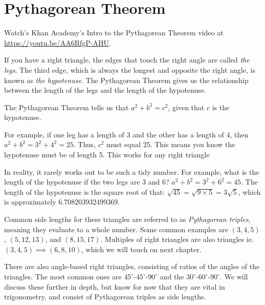 \chapter{Pythagorean Theorem}

Watch's Khan Academy's Intro to the Pythagorean Theorem video at \url{https://youtu.be/AA6RfgP-AHU}.

If you have a right triangle, the edges that touch the right angle are
called \emph{the legs}.  The third edge, which is always the longest and opposite the right angle,
is known as \emph{the hypotenuse}. The Pythagorean Theorem gives us
the relationship between the length of the legs and the length of the
hypotenuse.


The Pythagorean Theorem tells us that $a^2 + b^2 = c^2$, given that $c$ is the hypotenuse.

For example, if one leg has a length of 3 and the other has a length of 4, then
$a^2 + b^2 = 3^2 + 4^2 = 25$. Thus, $c^2$ must equal 25. This means you know
the hypotenuse must be of length 5. This works for any right triangle

In reality, it rarely works out to be such a tidy number. For
example, what is the length of the hypotenuse if the two legs are 3
and 6? $a^2 + b^2 = 3^2 + 6^2 = 45$.  The length of the hypotenuse is
the square root of that: $\sqrt{45} = \sqrt{9 \times 5} = 3 \sqrt{5}$,
which is approximately 6.708203932499369.

Common side lengths for these triangles are referred to as \emph{Pythagorean triples}, meaning they evaluate to a whole number. Some common examples are $(3, 4, 5)$, $(5, 12, 13)$, and $(8, 15, 17)$. Multiples of right triangles are also triangles ie. $(3, 4, 5) \implies (6, 8, 10)$, which we will touch on next chapter.

There are also angle-based right triangles, consisting of ratios of the angles of the triangles. The most common ones are $45^\circ$-$45^\circ$-$90^\circ$ and the $30^\circ$-$60^\circ$-$90^\circ$. We will discuss these further in depth, but know for now that they are vital in trigonometry, and consist of Pythagorean triples as side lengths. 

